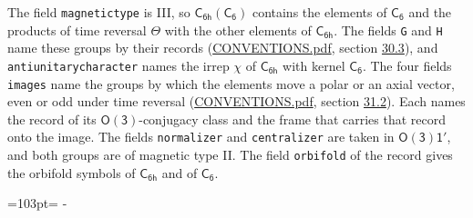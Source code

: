 \documentclass[10pt,a4paper]{article}
\newcommand{\needspace}[1]{\par\penalty-100\begingroup\dimen0=#1\relax\dimen2=\pagegoal
  \advance\dimen2-\pagetotal\ifdim\dimen0>\dimen2\relax\ifdim\dimen2>0pt\vfil\break\fi\fi
  \endgroup}
\numberwithin{equation}{section}
\newcommand{\grp}[1]{\mathsf{#1}}
\begin{document}
The field \texttt{magnetictype} is III, so $\grp{C_{6h}}(\grp{C_{6}})$ contains the elements of $\grp{C_{6}}$ and the products of time reversal $\varTheta$ with the other elements of $\grp{C_{6h}}$. The fields \texttt{G} and \texttt{H} name these groups by their records (\href{../../CONVENTIONS.pdf}{CONVENTIONS.pdf}, section \href{../../CONVENTIONS.pdf\#conv.30.3}{30.3}), and \texttt{antiunitarycharacter} names the irrep $\chi$ of $\grp{C_{6h}}$ with kernel $\grp{C_{6}}$. The four fields \texttt{images} name the groups by which the elements move a polar or an axial vector, even or odd under time reversal (\href{../../CONVENTIONS.pdf}{CONVENTIONS.pdf}, section \href{../../CONVENTIONS.pdf\#conv.31.2}{31.2}). Each names the record of its $\grp{O(3)}$-conjugacy class and the frame that carries that record onto the image. The fields \texttt{normalizer} and \texttt{centralizer} are taken in $\grp{O(3)1'}$, and both groups are of magnetic type II. The field \texttt{orbifold} of the record gives the orbifold symbols of $\grp{C_{6h}}$ and of $\grp{C_{6}}$.
\needspace{103pt}
\end{document}
